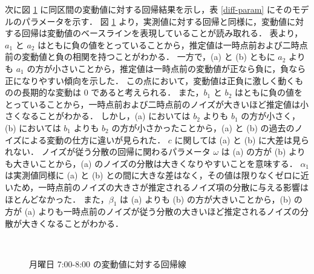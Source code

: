 \documentclass[technicalreport]{ieicej}
\begin{document}
次に図 \ref{diff-reg} に同区間の変動値に対する回帰結果を示し，表 \ref{diff-param} にそのモデルのパラメータを示す．
図 \ref{diff-reg} より，実測値に対する回帰と同様に，変動値に対する回帰は変動値のベースラインを表現していることが読み取れる．
表より，$a_1$ と $a_2$ はともに負の値をとっていることから，推定値は一時点前および二時点前の変動値と負の相関を持つことがわかる．
一方で，(a) と (b) ともに $a_2$ よりも $a_1$ の方が小さいことから，推定値は一時点前の変動値が正なら負に，負なら正になりやすい傾向を示した．
この点において，変動値は正負に激しく動くものの長期的な変動は 0 であると考えられる．
また，$b_1$ と $b_2$ はともに負の値をとっていることから，一時点前および二時点前のノイズが大きいほど推定値は小さくなることがわかる．
しかし，(a) においては $b_2$ よりも $b_1$ の方が小さく，(b) においては $b_1$ よりも $b_2$ の方が小さかったことから，(a) と (b) の過去のノイズによる変動の仕方に違いが見られた．
$c$ に関しては (a) と (b) に大差は見られない．
ノイズが従う分散の回帰に関わるパラメータ $\omega$ は (a) の方が (b) よりも大きいことから，(a) のノイズの分散は大きくなりやすいことを意味する．
$\alpha_1$ は実測値同様に (a) と (b) との間に大きな差はなく，その値は限りなくゼロに近いため，一時点前のノイズの大きさが推定されるノイズ項の分散に与える影響はほとんどなかった．
また，$\beta_1$ は (a) よりも (b) の方が大きいことから，(b) の方が (a) よりも一時点前のノイズが従う分散の大きいほど推定されるノイズの分散が大きくなることがわかる．

\begin{figure}[tb]
\begin{center}
~
~
\caption{月曜日 7:00-8:00 の変動値に対する回帰線}
\label{diff-reg}
\end{center}
\end{figure}
\end{document}

